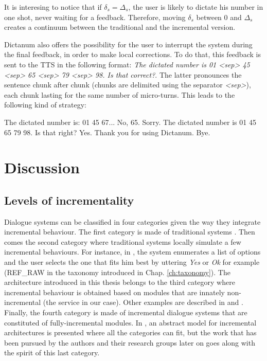         It is interesing to notice that if $\delta_s = \Delta_s$, the user is likely to dictate his number in one shot, never waiting for a feedback. Therefore, moving $\delta_s$ between 0 and $\Delta_s$ creates a continuum between the traditional and the incremental version.
        
        Dictanum also offers the possibility for the user to interrupt the system during the final feedback, in order to make local corrections. To do that, this feedback is sent to the TTS in the following format: \textit{The dictated number is 01 <sep> 45 <sep> 65 <sep> 79 <sep> 98. Is that correct?}. The latter pronounces the sentence chunk after chunk (chunks are delimited using the separator \textit{<sep>}), each chunk lasting for the same number of micro-turns. This leads to the following kind of strategy:
        
        \begin{dialogue}
             The dictated number is: 01 45 67...
             No, 65.
             Sorry. The dictated number is 01 45 65 79 98. Is that right?
             Yes.
             Thank you for using Dictanum. Bye.
        \end{dialogue}
    
\section{Discussion}

	\subsection{Levels of incrementality}
    
    	Dialogue systems can be classified in four categories given the way they integrate incremental behaviour. The first category is made of traditional systems \cite{CLASSiCd64}. Then comes the second category where traditional systems locally simulate a few incremental behaviours. For instance, in \cite{El-Asri2014a}, the system enumerates a list of options and the user selects the one that fits him best by uttering \textit{Yes} or \textit{Ok} for example (REF\_RAW in the taxonomy introduced in Chap. \ref{ch:taxonomy}). The architecture introduced in this thesis belongs to the third category where incremental behaviour is obtained based on modules that are innately non-incremental (the service in our case). Other examples are described in \cite{Selfridge2012a} and \cite{Hastie2013}. Finally, the fourth category is made of incremental dialogue systems that are constituted of fully-incremental modules. In \cite{Schlangen2011}, an abstract model for incremental architectures is presented where all the categories can fit, but the work that has been pursued by the authors and their research groups later on goes along with the spirit of this last category.
		
